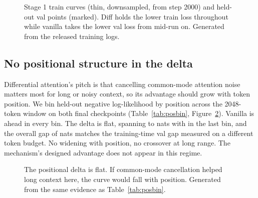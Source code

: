 \begin{table}[tbp]
\centering

\caption{Stage 1 (162M params, 2.0B tokens) endpoints, seed 0, paired
init, identical data order. Positive $\delta$ favors vanilla. Generated
from the released training logs.}
\label{tab:stage1}
\end{table}

\begin{figure}[tbp]
\centering

\caption{Stage 1 train curves (thin, downsampled, from step 2000) and
held-out val points (marked). Diff holds the lower train loss
throughout while vanilla takes the lower val loss from mid-run on.
Generated from the released training logs.}
\label{fig:curves}
\end{figure}

\subsection{No positional structure in the delta}
Differential attention's pitch is that cancelling common-mode attention
noise matters most for long or noisy context, so its advantage should
grow with token position. We bin held-out negative log-likelihood by
position across the 2048-token window on both final checkpoints
(Table~\ref{tab:posbin}, Figure~\ref{fig:posbin}). Vanilla is ahead in
every bin. The delta is flat, spanning \PosbinMinDelta{} to
\PosbinMaxDelta{} nats with \PosbinLastBinDelta{} in the last bin, and
the overall gap of \PosbinOverallDelta{} nats matches the training-time
val gap measured on a different token budget. No widening with
position, no crossover at long range. The mechanism's designed
advantage does not appear in this regime.

\begin{table}[tbp]
\centering

\caption{Held-out NLL by token position, both Stage 1 final
checkpoints. Positive $\delta$ favors vanilla. Generated from the
committed per-position evaluation.}
\label{tab:posbin}
\end{table}

\begin{figure}[tbp]
\centering

\caption{The positional delta is flat. If common-mode cancellation
helped long context here, the curve would fall with position. Generated
from the same evidence as Table~\ref{tab:posbin}.}
\label{fig:posbin}
\end{figure}

\FloatBarrier

